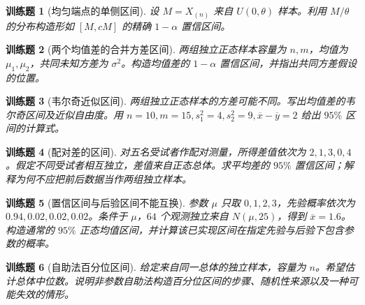 \documentclass[UTF8,12pt,a4paper,fontset=fandol]{ctexbook}
\newtheorem{exercise}{训练题}[section]
\begin{document}
\begin{exercise}[均匀端点的单侧区间]\label{q:B13.2}
设 $M=X_{(n)}$ 来自 $U(0,\theta)$ 样本。利用 $M/\theta$ 的分布构造形如 $[M,cM]$ 的精确 $1-\alpha$ 置信区间。\par{}\end{exercise}

\begin{exercise}[两个均值差的合并方差区间]\label{q:B13.3}
两组独立正态样本容量为 $n,m$，均值为 $\mu_1,\mu_2$，共同未知方差为 $\sigma^2$。构造均值差的 $1-\alpha$ 置信区间，并指出共同方差假设的位置。\par{}\end{exercise}

\begin{exercise}[韦尔奇近似区间]\label{q:B13.4}
两组独立正态样本的方差可能不同。写出均值差的韦尔奇区间及近似自由度。用 $n=10,m=15,s_1^2=4,s_2^2=9,\overline x-\overline y=2$ 给出 $95\%$ 区间的计算式。\par{}\end{exercise}

\begin{exercise}[配对差的区间]\label{q:B13.5}
对五名受试者作配对测量，所得差值依次为 $2,1,3,0,4$。假定不同受试者相互独立，差值来自正态总体。求平均差的 $95\%$ 置信区间；解释为何不应把前后数据当作两组独立样本。\par{}\end{exercise}

\begin{exercise}[置信区间与后验区间不能互换]\label{q:M-P10-5}
参数 $\mu$ 只取 $0,1,2,3$，先验概率依次为 $0.94,0.02,0.02,0.02$。条件于 $\mu$，$64$ 个观测独立来自 $N(\mu,25)$，得到 $\overline x=1.6$。构造通常的 $95\%$ 正态均值区间，并计算该已实现区间在指定先验与后验下包含参数的概率。\par{}\end{exercise}

\begin{exercise}[自助法百分位区间]\label{q:B13.6}
给定来自同一总体的独立样本，容量为 $n$。希望估计总体中位数。说明非参数自助法构造百分位区间的步骤、随机性来源以及一种可能失效的情形。\par{}\end{exercise}
\end{document}
